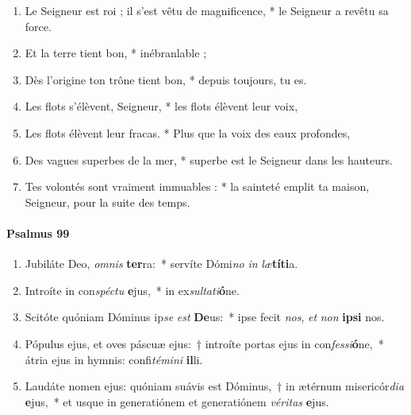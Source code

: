 \documentclass[twoside]{article}
\begin{document}
\begin{paracol}[1]{2}
\begin{enumerate}[wide, itemsep=0mm, labelwidth=!, labelindent=0pt, label=\color{gregoriocolor}\theenumi]
\item Le Seigneur est roi ; il s'est vêtu de magnificence, *
le Seigneur a revêtu sa force.

\item Et la terre tient bon, * inébranlable ;

\item Dès l'origine ton trône tient bon, *
depuis toujours, tu es.

\item Les flots s'élèvent, Seigneur, *
les flots élèvent leur voix,

\item Les flots élèvent leur fracas. *
Plus que la voix des eaux profondes,

\item Des vagues superbes de la mer, *
superbe est le Seigneur dans les hauteurs.

\item Tes volontés sont vraiment immuables : *
la sainteté emplit ta maison, Seigneur, pour la suite des temps.

\end{enumerate}

\switchcolumn*
\paragraph{Psalmus 99}


\begin{enumerate}[wide, itemsep=0mm, labelwidth=!, labelindent=0pt, label=\color{gregoriocolor}\theenumi]
\item Jubiláte Deo, \textit{om}\textit{nis} \textbf{ter}ra:~* servíte Dómi\textit{no} \textit{in} \textit{læ}\textbf{tí}\textbf{ti}a.

\item Introíte in con\textit{spéc}\textit{tu} \textbf{e}jus,~* in ex\textit{sul}\textit{ta}\textit{ti}\textbf{ó}ne.

\item Scitóte quóniam Dóminus ip\textit{se} \textit{est} \textbf{De}us:~* ipse fecit \textit{nos}, \textit{et} \textit{non} \textbf{ip}\textbf{si} nos.

\item Pópulus ejus, et oves páscuæ ejus:~† introíte portas ejus in con\textit{fes}\textit{si}\textbf{ó}ne,~* átria ejus in hymnis: confi\textit{té}\textit{mi}\textit{ni} \textbf{il}li.

\item Laudáte nomen ejus: quóniam suávis est Dóminus,~† in ætérnum misericór\textit{di}\textit{a} \textbf{e}jus,~* et usque in generatiónem et generatiónem \textit{vé}\textit{ri}\textit{tas} \textbf{e}jus.


\end{enumerate}
\end{paracol}
\end{document}
